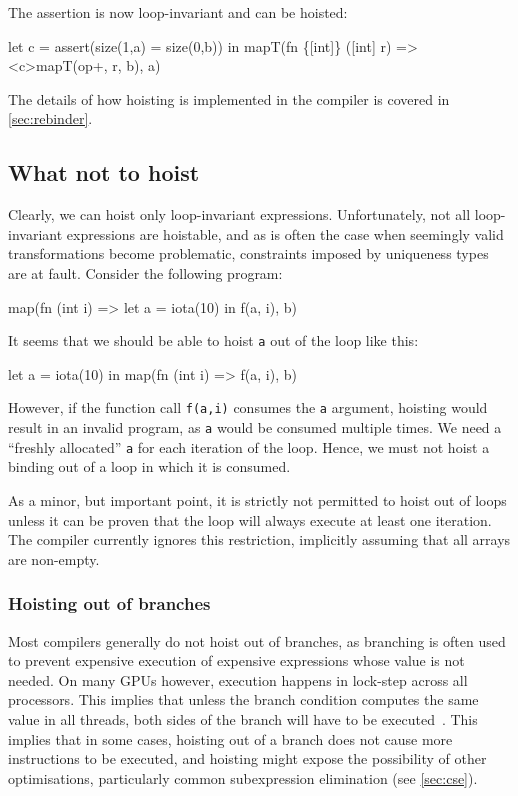 The assertion is now loop-invariant and can be hoisted:

\begin{colorcode}
let c = assert(size(1,a) = size(0,b)) in
mapT(fn \{[int]\} ([int] r) =>
       <c>mapT(op+, r, b),
    a)
\end{colorcode}

The details of how hoisting is implemented in the \LO{} compiler is
covered in \cref{sec:rebinder}.

\subsection{What not to hoist}
\label{sec:when-not-to-hoist}

Clearly, we can hoist only loop-invariant expressions.  Unfortunately,
not all loop-invariant expressions are hoistable, and as is often the
case when seemingly valid transformations become problematic,
constraints imposed by uniqueness types are at fault.  Consider the
following program:

\begin{colorcode}
map(fn (int i) =>
      let a = iota(10) in
      f(a, i),
    b)
\end{colorcode}

It seems that we should be able to hoist \texttt{a} out of the loop
like this:

\begin{colorcode}
let a = iota(10) in
map(fn (int i) =>
      f(a, i),
    b)
\end{colorcode}

However, if the function call \texttt{f(a,i)} consumes the \texttt{a}
argument, hoisting would result in an invalid program, as \texttt{a}
would be consumed multiple times.  We need a ``freshly allocated''
\texttt{a} for each iteration of the loop.  Hence, we must not hoist a
binding out of a loop in which it is consumed.

As a minor, but important point, it is strictly not permitted to hoist
out of loops unless it can be proven that the loop will always execute
at least one iteration.  The \LO{} compiler currently ignores this
restriction, implicitly assuming that all arrays are non-empty.

\subsubsection{Hoisting out of branches}

Most compilers generally do not hoist out of branches, as branching is
often used to prevent expensive execution of expensive expressions
whose value is not needed.  On many GPUs however, execution happens in
lock-step across all processors.  This implies that unless the branch
condition computes the same value in all threads, both sides of the
branch will have to be executed~\cite{reducing-branch-divergence}.
This implies that in some cases, hoisting out of a branch does not
cause more instructions to be executed, and hoisting might expose the
possibility of other optimisations, particularly common subexpression
elimination (see \cref{sec:cse}).


